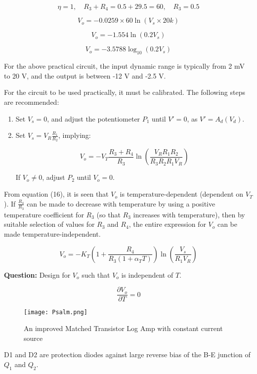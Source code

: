 \documentclass[a4paper,9pt,twoside,openany,twocolumn]{memoir}
\begin{document}
\[
\eta = 1, \quad R_3 + R_4 = 0.5 + 29.5 = 60, \quad R_3 = 0.5
\]

\[
V_o = -0.0259 \times 60 \ln \left( V_s \times 20k \right) \tag{18}
\]

\[
V_o = -1.554 \ln \left( 0.2 V_s \right) \tag{19}
\]

\[
V_o = -3.5788 \log_{10} \left( 0.2 V_s \right) \tag{20}
\]

For the above practical circuit, the input dynamic range is typically from 2 mV to 20 V, and the output is between -12 V and -2.5 V.

For the circuit to be used practically, it must be calibrated. The following steps are recommended:

\begin{enumerate}
    \item Set \( V_s = 0 \), and adjust the potentiometer \( P_1 \) until \( V' = 0 \), as \( V' = A_d (V_d) \).
    \item Set \( V_s = V_R \frac{R_1}{R_2} \), implying:

    \[
    V_o = -V_T \frac{R_3 + R_4}{R_3} \ln \left( \frac{V_R R_1 R_2}{R_3 R_2 R_1 V_R} \right)
    \]

    If \( V_o \neq 0 \), adjust \( P_2 \) until \( V_o = 0 \).
\end{enumerate}

From equation (16), it is seen that \( V_o \) is temperature-dependent (dependent on \( V_T \)). If \( \frac{R_4}{R_3} \) can be made to decrease with temperature by using a positive temperature coefficient for \( R_3 \) (so that \( R_3 \) increases with temperature), then by suitable selection of values for \( R_3 \) and \( R_4 \), the entire expression for \( V_o \) can be made temperature-independent.

\[
V_o = -K_T \left( 1 + \frac{R_4}{R_3 (1 + \alpha_T T)} \right) \ln \left( \frac{V_s}{R_1 V_R} \right) \tag{21}
\]

\textbf{Question:} Design for \( V_o \) such that \( V_o \) is independent of \( T \). 

\[
\frac{\partial V_o}{\partial T} = 0 \tag{22}
\]

\begin{figure}[H]
    \centering
    \texttt{[image: Psalm.png]}
    \caption{An improved Matched Transistor Log Amp with constant current source}
    \label{fig:question_image}
\end{figure}

D1 and D2 are protection diodes against large reverse bias of the B-E junction of \( Q_1 \) and \( Q_2 \). 
\end{document}
